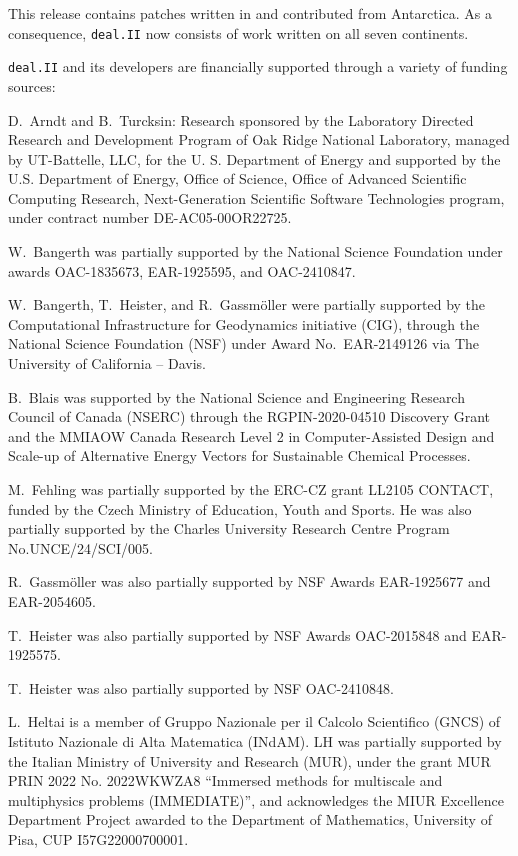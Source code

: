 \documentclass{ansarticle-preprint}
\newcommand{\specialword}[1]{\texttt{#1}}
\newcommand{\dealii}{{\specialword{deal.II}}\xspace}
\begin{document}
This release contains patches written in and contributed from
Antarctica. As a consequence, \dealii{} now consists of work written
on all seven continents.

\bigskip

\dealii and its developers are financially supported through a
variety of funding sources:

D.~Arndt and B.~Turcksin: Research sponsored by the Laboratory Directed Research and
Development Program of Oak Ridge National Laboratory, managed by UT-Battelle,
LLC, for the U. S. Department of Energy and supported by the U.S. Department of Energy,
Office of Science, Office of Advanced Scientific Computing Research,
Next-Generation Scientific Software Technologies program, under contract
number DE-AC05-00OR22725.

W.~Bangerth was partially supported by the National Science Foundation
under awards OAC-1835673, EAR-1925595, and OAC-2410847.

W.~Bangerth, T.~Heister, and R.~Gassm\"{o}ller were partially
supported by the Computational Infrastructure for Geodynamics initiative
(CIG), through the National Science Foundation (NSF) under Award
No.~EAR-2149126 via The University of California -- Davis.


B.~Blais was supported by the National Science and Engineering Research Council of Canada (NSERC)  through the RGPIN-2020-04510 Discovery Grant and the MMIAOW Canada Research Level 2 in Computer-Assisted Design and Scale-up of Alternative Energy Vectors for Sustainable Chemical Processes.

M.~Fehling was partially supported by the ERC-CZ grant LL2105 CONTACT,
funded by the Czech Ministry of Education, Youth and Sports. He was also
partially supported by the Charles University Research Centre Program No.\@ UNCE/24/SCI/005.

R.~Gassm\"{o}ller was also partially supported by NSF Awards EAR-1925677
and EAR-2054605.

T.~Heister was also partially supported by NSF Awards OAC-2015848 and EAR-1925575.

T.~Heister was also partially supported by NSF OAC-2410848.

L.~Heltai is a member of Gruppo Nazionale per il Calcolo Scientifico (GNCS) of
Istituto Nazionale di Alta Matematica (INdAM). LH was partially supported by
the Italian Ministry of University and Research (MUR), under the grant MUR PRIN
2022 No. 2022WKWZA8 ``Immersed methods for multiscale and multiphysics problems
(IMMEDIATE)'', and acknowledges the MIUR Excellence Department Project awarded
to the Department of Mathematics, University of Pisa, CUP I57G22000700001.
\end{document}
